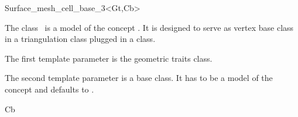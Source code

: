 

\begin{ccRefClass}{Surface_mesh_cell_base_3<Gt,Cb>}  %


\ccDefinition
  
The class \ccRefName\ is a model of the concept
.
It is designed to serve  as vertex base  class
in a  triangulation class  
plugged in a  
class.

The first template parameter is the geometric traits class.

The second template parameter is a base class. It
has to be a model of the concept 
and  
defaults to .


\ccIsModel


\ccInheritsFrom 

Cb







\ccSeeAlso

 \\
 \\



\end{ccRefClass}
